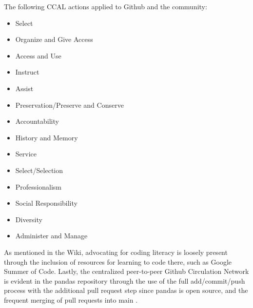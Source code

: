 The following CCAL actions applied to Github and the community: 

\begin{itemize}
  \item Select \cite{gorman2000values} \cite{rubin2016foundationslis}
  \item Organize and Give Access \cite{gorman2000values}
  \item Access and Use \cite{rubin2016foundationslis}
  \item Instruct \cite{gorman2000values}
  \item Assist \cite{gorman2000values}
  \item Preservation/Preserve and Conserve  \cite{rubin2016foundationslis} \cite{gorman2000values}
  \item Accountability \cite{rubin2016foundationslis}
  \item History and Memory \cite{rubin2016foundationslis}
  \item Service \cite{rubin2016foundationslis}
  \item Select/Selection \cite{gorman2000values} \cite{rubin2016foundationslis}
  \item Professionalism \cite{rubin2016foundationslis}
  \item Social Responsibility \cite{rubin2016foundationslis}
  \item Diversity \cite{rubin2016foundationslis}
  \item Administer and Manage \cite{gorman2000values}
\end{itemize}


As mentioned in the Wiki, advocating for coding literacy is loosely present through the inclusion of resources for learning to code there, such as Google Summer of Code. Lastly, the centralized peer-to-peer Github Circulation Network is evident in the pandas repository through the use of the full add/commit/push process with the additional pull request step since pandas is open source, and the frequent merging of pull requests into main \cite{pandasrepo}. 



